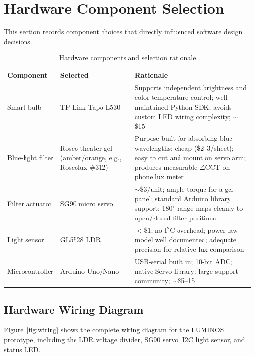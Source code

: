 \documentclass[12pt,letterpaper]{article}
\begin{document}
\section{Hardware Component Selection}

This section records component choices that directly influenced software design
decisions.

\begin{table}[H]
  \centering
  \caption{Hardware components and selection rationale}
  \label{tab:hardware}
  \begin{tabular}{p{3cm}p{4cm}p{6cm}}
    \toprule
    \textbf{Component} & \textbf{Selected} & \textbf{Rationale} \\
    \midrule
    Smart bulb &
      TP-Link Tapo L530 &
      Supports independent brightness and color-temperature control;
      well-maintained Python SDK; avoids custom LED wiring complexity;
      $\sim$\$15 \\
    \addlinespace
    Blue-light filter &
      Rosco theater gel (amber/orange, e.g., Roscolux \#312) &
      Purpose-built for absorbing blue wavelengths; cheap
      (\$2–3/sheet); easy to cut and mount on servo arm;
      produces measurable $\Delta$CCT on phone lux meter \\
    \addlinespace
    Filter actuator &
      SG90 micro servo &
      $\sim$\$3/unit; ample torque for a gel panel; standard
      Arduino library support; 180$^\circ$ range maps cleanly to
      open/closed filter positions \\
    \addlinespace
    Light sensor &
      GL5528 LDR &
      $<$\$1; no I$^2$C overhead; power-law model well documented;
      adequate precision for relative lux comparison \\
    \addlinespace
    Microcontroller &
      Arduino Uno/Nano &
      USB-serial built in; 10-bit ADC; native Servo library;
      large support community; $\sim$\$5–15 \\
    \bottomrule
  \end{tabular}
\end{table}

\subsection{Hardware Wiring Diagram}

Figure~\ref{fig:wiring} shows the complete wiring diagram for the LUMINOS prototype, including the LDR voltage divider, SG90 servo, I2C light sensor, and status LED.
\end{document}
